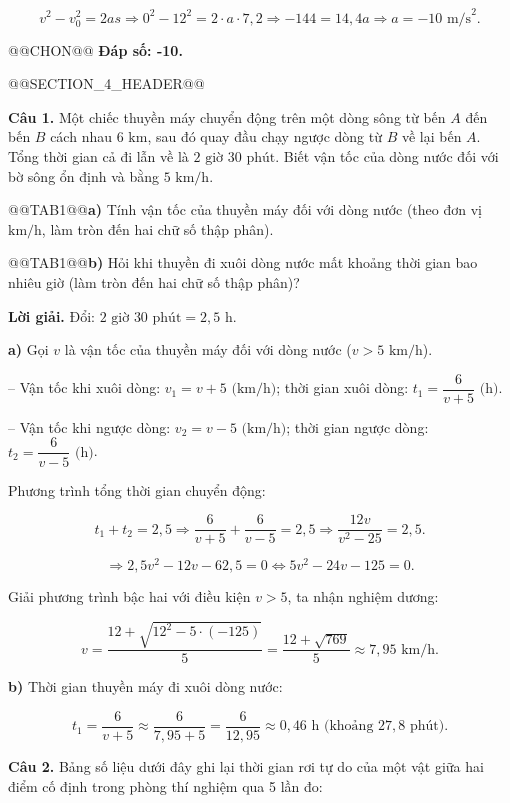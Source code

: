 \documentclass{article}
\begin{document}
\[v^2 - v_0^2 = 2as \Rightarrow 0^2 - 12^2 = 2 \cdot a \cdot 7{,}2 \Rightarrow -144 = 14{,}4a \Rightarrow a = -10\text{ m/s}^2.\]

@@CHON@@ \textbf{Đáp số: -10.}

@@SECTION_4_HEADER@@

\textbf{Câu 1.} Một chiếc thuyền máy chuyển động trên một dòng sông từ bến $A$ đến bến $B$ cách nhau $6\text{ km}$, sau đó quay đầu chạy ngược dòng từ $B$ về lại bến $A$. Tổng thời gian cả đi lẫn về là $2\text{ giờ } 30\text{ phút}$. Biết vận tốc của dòng nước đối với bờ sông ổn định và bằng $5\text{ km/h}$.

@@TAB1@@\textbf{a)} Tính vận tốc của thuyền máy đối với dòng nước (theo đơn vị $\text{km/h}$, làm tròn đến hai chữ số thập phân).

@@TAB1@@\textbf{b)} Hỏi khi thuyền đi xuôi dòng nước mất khoảng thời gian bao nhiêu giờ (làm tròn đến hai chữ số thập phân)?

\textbf{Lời giải.} Đổi: $2\text{ giờ } 30\text{ phút} = 2{,}5\text{ h}$.

\textbf{a)} Gọi $v$ là vận tốc của thuyền máy đối với dòng nước ($v > 5\text{ km/h}$).

-- Vận tốc khi xuôi dòng: $v_1 = v + 5\text{ (km/h)}$; thời gian xuôi dòng: $t_1 = \dfrac{6}{v + 5}\text{ (h)}$.

-- Vận tốc khi ngược dòng: $v_2 = v - 5\text{ (km/h)}$; thời gian ngược dòng: $t_2 = \dfrac{6}{v - 5}\text{ (h)}$.

Phương trình tổng thời gian chuyển động:

\[t_1 + t_2 = 2{,}5 \Rightarrow \frac{6}{v + 5} + \frac{6}{v - 5} = 2{,}5 \Rightarrow \frac{12v}{v^2 - 25} = 2{,}5.\]

\[\Rightarrow 2{,}5v^2 - 12v - 62{,}5 = 0 \Leftrightarrow 5v^2 - 24v - 125 = 0.\]

Giải phương trình bậc hai với điều kiện $v > 5$, ta nhận nghiệm dương:

\[v = \frac{12 + \sqrt{12^2 - 5 \cdot (-125)}}{5} = \frac{12 + \sqrt{769}}{5} \approx 7{,}95\text{ km/h}.\]

\textbf{b)} Thời gian thuyền máy đi xuôi dòng nước:

\[t_1 = \frac{6}{v + 5} \approx \frac{6}{7{,}95 + 5} = \frac{6}{12{,}95} \approx 0{,}46\text{ h} \text{ (khoảng } 27{,}8\text{ phút)}.\]

\textbf{Câu 2.} Bảng số liệu dưới đây ghi lại thời gian rơi tự do của một vật giữa hai điểm cố định trong phòng thí nghiệm qua 5 lần đo:
\end{document}
